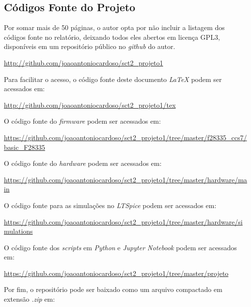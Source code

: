 \documentclass[
	12pt,				%
	article,			%
	openright,			%
	oneside,
	a4paper,			%
	chapter=TITLE,		%
	section=TITLE,		%
	english,			%
	french,				%
	spanish,			%
	brazil,				%
]{abntex2}
\begin{document}
	\begin{apendicesenv}
		\partapendices
% 		

        \chapter{Códigos Fonte do Projeto}
            \label{ap-scripts}
            Por somar mais de 50 páginas, o autor opta por não incluir a listagem dos códigos fonte no relatório, deixando todos  eles abertos em licença GPL3, disponíveis em um repositório público no \textit{github} do autor.
            
            \url{http://github.com/joaoantoniocardoso/sct2_projeto1}
            
            Para facilitar o acesso, o código fonte deste documento \textit{LaTeX} podem ser acessados em:
            
            \url{http://github.com/joaoantoniocardoso/sct2_projeto1/tex}
            
            O código fonte do \textit{firmware} podem ser acessados em:
            
            \url{https://github.com/joaoantoniocardoso/sct2_projeto1/tree/master/f28335_ccs7/basic_F28335}
            
            O código fonte do \textit{hardware} podem ser acessados em:
            
            \url{https://github.com/joaoantoniocardoso/sct2_projeto1/tree/master/hardware/main}
            
            O código fonte para as simulações no \textit{LTSpice} podem ser acessados em:
            
            \url{https://github.com/joaoantoniocardoso/sct2_projeto1/tree/master/hardware/simulations}
            
            O código fonte dos \textit{scripts} em \textit{Python} e \textit{Jupyter Notebook} podem ser acessados em:
            
            \url{https://github.com/joaoantoniocardoso/sct2_projeto1/tree/master/projeto}
            
            Por fim, o repositório pode ser baixado como um arquivo compactado em extensão \textit{.zip} em:
            

\end{apendicesenv}
\end{document}
